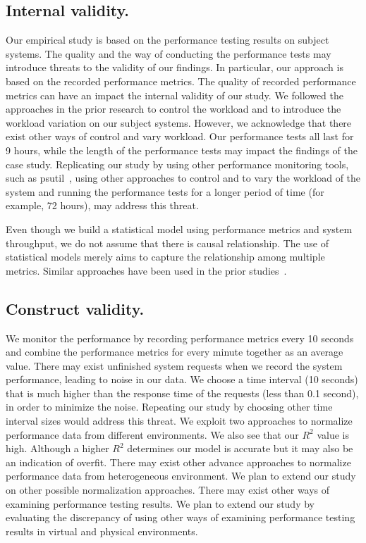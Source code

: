 	\subsection{Internal validity.}
	
	Our empirical study is based on the performance testing results on subject systems. The quality and the way of conducting the performance tests may introduce threats to the validity of our findings. In particular, our approach is based on the recorded performance metrics. The quality of recorded performance metrics can have an impact the internal validity of our study. We followed the approaches in the prior research to control the workload and to introduce the workload variation on our subject systems. However, we acknowledge that there exist other ways of control and vary workload. Our performance tests all last for 9 hours, while the length of the performance tests may impact the findings of the case study. Replicating our study by using other performance monitoring tools, such as psutil~\cite{psutil}, using other approaches to control and to vary the workload of the system and running the performance tests for a longer period of time (for example, 72 hours), may address this threat.
	
	Even though we build a statistical model using performance metrics and system throughput, we do not assume that there is causal relationship. The use of statistical models merely aims to capture the relationship among multiple metrics. Similar approaches have been used in the prior studies~\cite{Cohen:2005:CIC:1095810.1095821, Shang:2015:ADP:2668930.2688052, xiong2013vperfguard}. 
	
	
	
	\subsection{Construct validity.}
	We monitor the performance by recording performance metrics every 10 seconds and combine the performance metrics for every minute together as an average value. There may exist unfinished system requests when we record the system performance, leading to noise in our data. We choose a time interval (10 seconds) that is much higher than the response time of the requests (less than 0.1 second), in order to minimize the noise. Repeating our study by choosing other time interval sizes would address this threat. We exploit two approaches to normalize performance data from different environments. We also see that our {$R^2$} value is high. Although a higher {$R^2$} determines our model is accurate but it may also be an indication of overfit. There may exist other advance approaches to normalize performance data from heterogeneous environment. We plan to extend our study on other possible normalization approaches. There may exist other ways of examining performance testing results. We plan to extend our study by evaluating the discrepancy of using other ways of examining performance testing results in virtual and physical environments.
	
